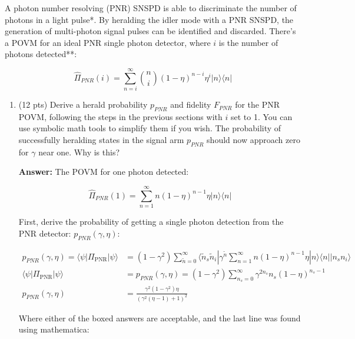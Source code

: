 \documentclass[11pt]{caltech_thesis} %
\begin{document}
A photon number resolving (PNR) SNSPD is able to discriminate the number
of photons in a light pulse*. By heralding the idler mode with a PNR
SNSPD, the generation of multi-photon signal pulses can be identified
and discarded. There's a POVM for an ideal PNR single photon detector,
where \(i\) is the number of photons detected**:

\[\hat{\Pi}_{PNR}(i)=\sum_{n=i}^{\infty}\binom{n}{i}(1-\eta)^{n-i} \eta^{i}|n\rangle\langle n|\]

\begin{enumerate}
\def\labelenumi{\arabic{enumi}.}
\setcounter{enumi}{3}
\item
  (12 pts) Derive a herald probability \(p_{PNR}\) and fidelity
  \(F_{PNR}\) for the PNR POVM, following the steps in the previous
  sections with \(i\) set to 1. You can use symbolic math tools to
  simplify them if you wish. The probability of successfully heralding
  states in the signal arm \(p_{PNR}\) should now approach zero for
  \(\gamma\) near one. Why is this?

  {\color{midnightblue}  \textbf{Answer:} } {\color{midnightblue} The
  POVM for one photon detected:}

  {\color{midnightblue} 

  \[\hat{\Pi}_{PNR}(1)=\sum_{n=1}^{\infty}n(1-\eta)^{n-1} \eta|n\rangle\langle n|\]

  }

  {\color{midnightblue} First, derive the probability of getting a
  single photon detection from the PNR detector:
  \(p_{PNR}(\gamma, \eta)\):}

  {\color{midnightblue} 

  \[\begin{aligned}
       p_{PNR}(\gamma, \eta) =\langle \psi | \Pi_{\text {PNR}} | \psi \rangle &= (1- \gamma^2) \sum_{\tilde{n}=0}^{\infty} \langle \tilde{n}_s \tilde{n}_i | \gamma^{\tilde{n}} \sum_{n=1}^{\infty}n(1-\eta)^{n-1} \eta|n\rangle\langle n| | n_s n_i \rangle \\
       \langle \psi | \Pi_{\text {PNR}} | \psi \rangle &= p_{PNR}\left(\gamma, \eta\right) =  \boxed{(1-\gamma^2) \sum_{n_s=0}^{\infty} \gamma^{2n_s} n_s(1-\eta)^{n_s-1}}\\
       p_{PNR}\left(\gamma, \eta\right) &=  \boxed{\frac{\gamma ^2 (1 - \gamma ^2) \eta }{(\gamma ^2 (\eta -1)+1)^2}}
   \end{aligned}\]

  }

  {\color{midnightblue} Where either of the boxed answers are
  acceptable, and the last line was found using mathematica:}


\end{enumerate}
\end{document}

